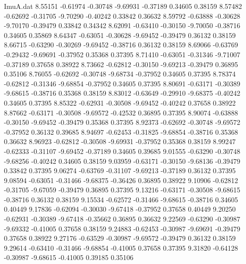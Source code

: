 \begin{filecontents}{ImuA.dat}
   8.55151   -0.61974   -0.30748   -9.69931   -0.37189    0.34605    0.38159
   8.57482   -0.62692   -0.31705   -9.70290   -0.40242    0.33842    0.36632
   8.59792   -0.63888   -0.30628   -9.70170   -0.39479    0.33842    0.34342
   8.62091   -0.63410   -0.30150   -9.70050   -0.38716    0.34605    0.35869
   8.64347   -0.63051   -0.30628   -9.69452   -0.39479    0.36132    0.38159
   8.66715   -0.63290   -0.30269   -9.69452   -0.38716    0.36132    0.38159
   8.69066   -0.63769   -0.29432   -9.69691   -0.37952    0.35368    0.37395
   8.71410   -0.63051   -0.31346   -9.71007   -0.37189    0.37658    0.38922
   8.73662   -0.62812   -0.30150   -9.69213   -0.39479    0.36895    0.35106
   8.76055   -0.62692   -0.30748   -9.68734   -0.37952    0.34605    0.37395
   8.78374   -0.62812   -0.31346   -9.68854   -0.37952    0.34605    0.37395
   8.80691   -0.63171   -0.30389   -9.68615   -0.38716    0.35368    0.38159
   8.83012   -0.63649   -0.29910   -9.68375   -0.40242    0.34605    0.37395
   8.85322   -0.62931   -0.30508   -9.69452   -0.40242    0.37658    0.38922
   8.87662   -0.63171   -0.30508   -9.69572   -0.42532    0.36895    0.37395
   8.90074   -0.63888   -0.30150   -9.69452   -0.39479    0.35368    0.37395
   8.92373   -0.62692   -0.30748   -9.69572   -0.37952    0.36132    0.39685
   8.94697   -0.62453   -0.31825   -9.68854   -0.38716    0.35368    0.36632
   8.96923   -0.62812   -0.30508   -9.69931   -0.37952    0.35368    0.38159
   8.99247   -0.62333   -0.31107   -9.69452   -0.37189    0.34605    0.39685
   9.01555   -0.63290   -0.30748   -9.68256   -0.40242    0.34605    0.38159
   9.03959   -0.63171   -0.30150   -9.68136   -0.39479    0.33842    0.37395
   9.06274   -0.63769   -0.31107   -9.69213   -0.37189    0.36132    0.37395
   9.08594   -0.63051   -0.31466   -9.68375   -0.36426    0.36895    0.38922
   9.10906   -0.62812   -0.31705   -9.67059   -0.39479    0.36895    0.37395
   9.13216   -0.63171   -0.30508   -9.68615   -0.38716    0.36132    0.38159
   9.15534   -0.62572   -0.31466   -9.68615   -0.38716    0.34605    0.40449
   9.17836   -0.62094   -0.30030   -9.67418   -0.37952    0.37658    0.40449
   9.20250   -0.62931   -0.30389   -9.67418   -0.35662    0.36895    0.36632
   9.22569   -0.63290   -0.30987   -9.69332   -0.41005    0.37658    0.38159
   9.24883   -0.62453   -0.30987   -9.69691   -0.39479    0.37658    0.38922
   9.27176   -0.63529   -0.30987   -9.69572   -0.39479    0.36132    0.38159
   9.29614   -0.63410   -0.31466   -9.68854   -0.41005    0.37658    0.37395
   9.31820   -0.64128   -0.30987   -9.68615   -0.41005    0.39185    0.35106

\end{filecontents}

